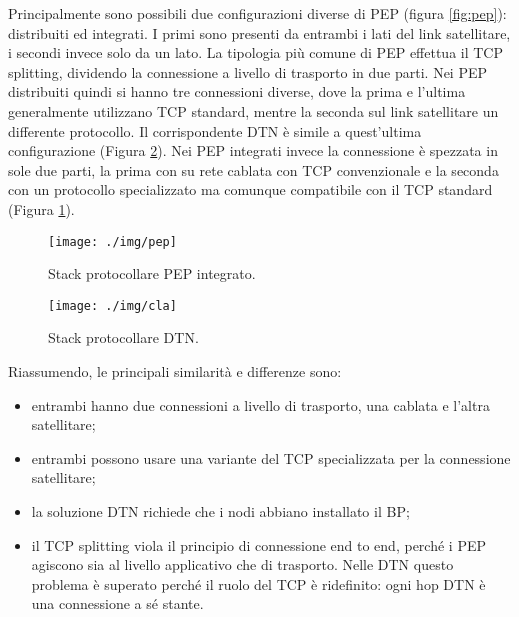 \documentclass[12pt,a4paper,oneside]{book}
\begin{document}
		Principalmente sono possibili due configurazioni diverse di PEP (figura \ref{fig:pep}): distribuiti ed integrati. I primi sono presenti da entrambi i lati del link satellitare, i secondi invece solo da un lato. 
		La tipologia più comune di PEP effettua il TCP splitting\cite{caini2007pepsal}, dividendo la connessione a livello di trasporto in due parti. Nei PEP distribuiti quindi si hanno tre connessioni diverse, dove la prima e l'ultima generalmente utilizzano TCP standard, mentre la seconda sul link satellitare un differente protocollo.
		Il corrispondente DTN è simile a quest'ultima configurazione (Figura \ref{fig:clastack}).
		Nei PEP integrati invece la connessione è spezzata in sole due parti, la prima con su rete cablata con TCP convenzionale e la seconda con un protocollo specializzato ma comunque compatibile con il TCP standard (Figura \ref{fig:pepstack}).
		\begin{figure}[h]
			\centering
			\texttt{[image: ./img/pep]}
			\caption{Stack protocollare PEP integrato.}
			\label{fig:pepstack}
		\end{figure}			

		\begin{figure}[h]
			\centering
			\texttt{[image: ./img/cla]}
			\caption{Stack protocollare DTN.}
			\label{fig:clastack}
		\end{figure}			

				
		Riassumendo, le principali similarità e differenze sono:
		\begin{itemize}
			\item entrambi hanno due connessioni a livello di trasporto, una cablata e l'altra satellitare;
			\item entrambi possono usare una variante del TCP specializzata per la connessione satellitare;
			\item la soluzione DTN richiede che i nodi abbiano installato il BP;
			\item il TCP splitting viola il principio di connessione end to end, perché i PEP agiscono sia al livello applicativo che di trasporto. Nelle DTN questo problema è superato perché il ruolo del TCP è ridefinito: ogni hop DTN è una connessione a sé stante.
 		\end{itemize}
		
\end{document}
